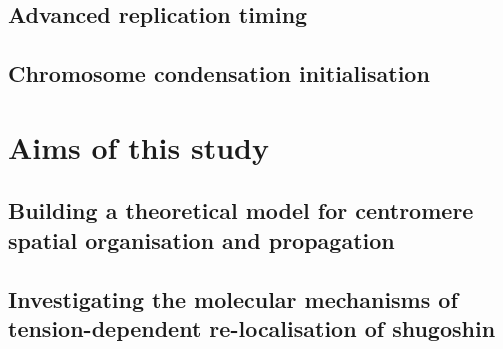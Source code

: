\subsection{Advanced replication timing}
\subsection{Chromosome condensation initialisation}
\section{Aims of this study}
\subsection{Building a theoretical model for centromere spatial organisation and propagation}
\subsection{Investigating the molecular mechanisms of tension-dependent re-localisation of shugoshin}
